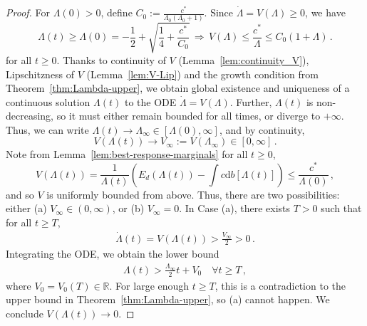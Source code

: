 \documentclass[10pt,a4paper]{amsart}
\def\R{\mathbb R}
\renewcommand{\d}{\mathrm{d}}
\begin{document}
\begin{proof}
  For $\Lambda(0)>0$, define $C_0:= \frac{c^*}{\Lambda_0(\Lambda_0+1)}$. Since $\dot\Lambda=V(\Lambda)\ge 0$, we have 
$$
\Lambda(t)\ge \Lambda(0)= -\frac{1}{2}+\sqrt{\frac{1}{4}+\frac{c^*}{C_0}}\,\Rightarrow\,
V(\Lambda)\le \frac{c^*}{\Lambda}\le C_0(1+\Lambda)\,.
$$
for all $t\ge 0$. Thanks to continuity of $V$ (Lemma~\ref{lem:continuity_V}), Lipschitzness of $V$ (Lemma~\ref{lem:V-Lip}) and the growth condition from Theorem~\ref{thm:Lambda-upper}, we obtain global existence and uniqueness of a continuous solution $\Lambda(t)$ to the ODE $\dot\Lambda=V(\Lambda)$.
Further, $\Lambda(t)$ is non-decreasing, so it must either remain bounded for all times, or diverge to $+\infty$. Thus, we can write $\Lambda(t)\to\Lambda_\infty\in [\Lambda(0),\infty]$, and by continuity, $$V(\Lambda(t))\to V_\infty:=V(\Lambda_\infty)\in [0,\infty]\,.$$ 
Note from Lemma~\ref{lem:best-response-marginals}  for all $t\ge 0$,
$$
V(\Lambda(t))= \frac{1}{\Lambda(t)}\left(E_d(\Lambda(t))-\int c\d b[\Lambda(t)]\right)\le \frac{c^*}{\Lambda(0)}\,,
$$
and so $V$ is uniformly bounded from above. Thus, 
there are two possibilities: either (a) $V_\infty\in (0,\infty)$, or (b) $V_\infty=0$.
In Case (a), there exists $T>0$ such that for all $t\ge T$,
\begin{align*}
    \dot\Lambda(t)=V(\Lambda(t))> \frac{V_\infty}{2}>0\,.
\end{align*}
Integrating the ODE, we obtain the lower bound
\begin{align*}
    \Lambda(t)>\frac{\Lambda_\infty}{2} t + V_0 \quad \forall t\ge T\,,
\end{align*}
where $V_0=V_0(T)\in\R$. For large enough $t\ge T$, this is a contradiction to the upper bound in Theorem~\ref{thm:Lambda-upper}, so (a) cannot happen. We conclude $V(\Lambda(t))\to 0$.  
\end{proof}
\end{document}
